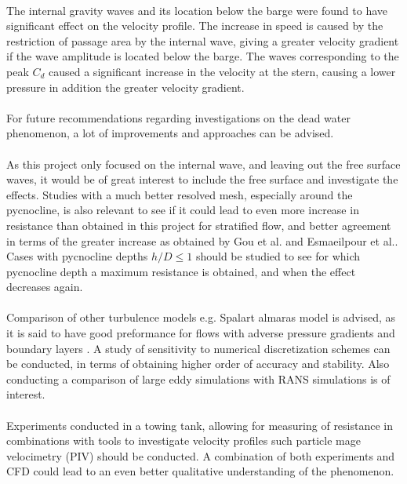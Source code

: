 \documentclass[a4paper, 12pt]{report}
\begin{document}
\\
The internal gravity waves and its location below the barge were found to have significant effect on the velocity profile. The increase in speed is caused by the restriction of passage area by the internal wave, giving a greater velocity gradient if the wave amplitude is located below the barge. The waves corresponding to the peak $C_d$ caused a significant increase in the velocity at the stern, causing a lower pressure in addition the greater velocity gradient. \\
\\
For future recommendations regarding investigations on the dead water phenomenon, a lot of improvements and approaches can be advised.\\
\\
As this project only focused on the internal wave, and leaving out the free surface waves, it would be of great interest to include the free surface and investigate the effects.  Studies with a much better resolved mesh, especially around the pycnocline, is also relevant to see if it could lead to even more increase in resistance than obtained in this project for stratified flow, and better agreement in terms of the greater increase as obtained by Gou et al.\cite{Gou} and Esmaeilpour et al.\cite{Esmaeilpour}. Cases with pycnocline depths $h/D\leq 1$ should be studied to see for which pycnocline depth a maximum resistance is obtained, and when the effect decreases again.\\
\\
Comparison of other turbulence models e.g. Spalart almaras model is advised, as it is said to have good preformance for flows with adverse pressure gradients and boundary layers \cite{CFD}. A study of sensitivity to numerical discretization schemes can be conducted, in terms of obtaining higher order of accuracy and stability. Also conducting a comparison of large eddy simulations with RANS simulations is of interest.\\
\\
Experiments conducted in a towing tank, allowing for measuring of resistance in combinations with tools to investigate velocity profiles such particle mage velocimetry (PIV) should be conducted. A combination of both experiments and CFD could lead to an even better qualitative understanding of the phenomenon. 
\end{document}
